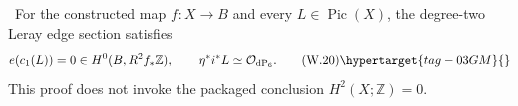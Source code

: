 \begin{proposition}
\hypertarget{tag-03IM}{}\label{wbII:prop:leray-edge-restriction}

\ For the constructed map $f:X\to B$ and every
$L\in\operatorname{Pic}(X)$, the degree-two Leray edge section satisfies
\[
 e(c_1(L))=0\in H^0(B,R^2f_*\mathbb Z),
 \qquad
 \eta^*i^*L\simeq\mathcal O_{\mathrm{dP}_6}.
\tag{W.20}\hypertarget{tag-03GM}{}\label{wbII:eq:W:5.17c}
\]
This proof does not invoke the packaged conclusion
$H^2(X;\mathbb Z)=0$.
\end{proposition}



